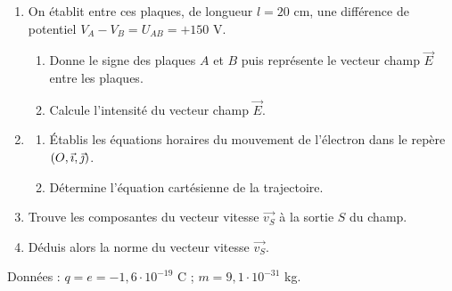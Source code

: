 \documentclass[11pt]{article}
\begin{document}
\begin{enumerate}
  \item On établit entre ces plaques, de longueur $l = 20$ cm, une différence de potentiel $V_A - V_B = U_{AB} = +150$ V.
  \begin{enumerate}[label=\alph*.]
    \item Donne le signe des plaques $A$ et $B$ puis représente le vecteur champ $\vec{E}$ entre les plaques.
    \item Calcule l'intensité du vecteur champ $\vec{E}$.
  \end{enumerate}
  \item \begin{enumerate}[label=\alph*.]
    \item Établis les équations horaires du mouvement de l'électron dans le repère $(O,\vec{\imath},\vec{\jmath})$.
    \item Détermine l'équation cartésienne de la trajectoire.
  \end{enumerate}
  \item Trouve les composantes du vecteur vitesse $\vec{v_S}$ à la sortie $S$ du champ.
  \item Déduis alors la norme du vecteur vitesse $\vec{v_S}$.
\end{enumerate}
\noindent Données : $q = e = -1{,}6\cdot10^{-19}$ C ; $m = 9{,}1\cdot10^{-31}$ kg.
\end{document}
